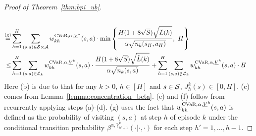 \begin{proof}[Proof of Theorem~\ref{thm:bpi_ub}]
\begin{align*}
		\\
		\overset{\textup{(g)}}{=} & \sum_{h=1}^{H} \sum_{(s,a) \in \cS \times \cA} w^{\cvar,\alpha,\underline{V}^k}_{kh}(s,a) \cdot \min \lbr{\frac{H(1+8\sqrt{S})\sqrt{\tilde{L}(k)}}{\alpha  \sqrt{n_k(s_H,a_H)}},\ H }
		\\
		\leq & \sum_{h=1}^{H} \sum_{(s,a) \in \cL_k} w^{\cvar,\alpha,\underline{V}^k}_{kh}(s,a) \cdot \frac{H(1+8\sqrt{S})\sqrt{\tilde{L}(k)}}{\alpha  \sqrt{n_k(s,a)}} + \sum_{h=1}^{H} \sum_{(s,a) \notin \cL_k} w^{\cvar,\alpha,\underline{V}^k}_{kh}(s,a) \cdot H 
	\end{align*}
	Here (b) is due to that for any $k>0$, $h \in [H]$ and $s \in \mathcal{S}$, $J^k_{h}(s) \in [0,H]$. (c) comes from Lemma~\ref{lemma:concentration_beta}. (e) and (f) follow from recurrently applying steps (a)-(d). (g) uses the fact that $w^{\textup{CVaR},\alpha,\underline{V}^k}_{kh}(s,a)$ is defined as the probability of visiting $(s,a)$ at step $h$ of episode $k$ under the conditional transition probability $\beta^{\alpha,\underline{V}_{h'+1}^{k}}(\cdot|\cdot,\cdot)$ for each step $h'=1,\dots,h-1$.
	

\end{proof}
